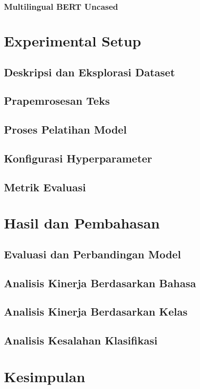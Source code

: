 \documentclass[11pt]{article}
\begin{document}
\subsubsection{Multilingual BERT Uncased}

\section{Experimental Setup}
\subsection{Deskripsi dan Eksplorasi Dataset}

\subsection{Prapemrosesan Teks}

\subsection{Proses Pelatihan Model}

\subsection{Konfigurasi Hyperparameter}

\subsection{Metrik Evaluasi}

\section{Hasil dan Pembahasan}
\subsection{Evaluasi dan Perbandingan Model}

\subsection{Analisis Kinerja Berdasarkan Bahasa}

\subsection{Analisis Kinerja Berdasarkan Kelas}

\subsection{Analisis Kesalahan Klasifikasi}

\section{Kesimpulan}
\end{document}
